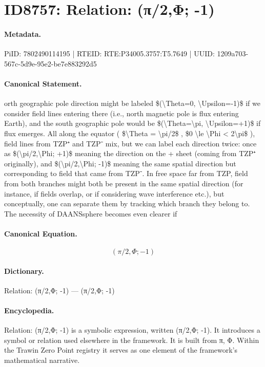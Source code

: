 \section*{ID8757: Relation: (π/2,Φ; -1)}
\paragraph{Metadata.}
PiID: 7802490114195 | RTEID: RTE:P34005.3757:T5.7649 | UUID: 1209a703-567c-5d9e-95e2-be7e883292d5

\paragraph{Canonical Statement.}
orth geographic pole direction might be labeled \$(\textbackslash{}Theta=0, \textbackslash{}Upsilon=-1)\$ if we consider field lines entering there (i.e., north magnetic pole is flux entering Earth), and the south geographic pole would be \$(\textbackslash{}Theta=\textbackslash{}pi, \textbackslash{}Upsilon=+1)\$ if flux emerges. All along the equator ( \$\textbackslash{}Theta = \textbackslash{}pi/2\$ , \$0 \textbackslash{}le \textbackslash{}Phi < 2\textbackslash{}pi\$ ), field lines from TZP⁺ and TZP⁻ mix, but we can label each direction twice: once as \$(\textbackslash{}pi/2,\textbackslash{}Phi; +1)\$ meaning the direction on the + sheet (coming from TZP⁺ originally), and \$(\textbackslash{}pi/2,\textbackslash{}Phi; -1)\$ meaning the same spatial direction but corresponding to field that came from TZP⁻. In free space far from TZP, field from both branches might both be present in the same spatial direction (for instance, if fields overlap, or if considering wave interference etc.), but conceptually, one can separate them by tracking which branch they belong to. The necessity of DAANSsphere becomes even clearer if

\paragraph{Canonical Equation.}
\[
(\pi/2,\Phi; -1)
\]

\paragraph{Dictionary.}
Relation: (π/2,Φ; -1) — (π/2,Φ; -1)

\paragraph{Encyclopedia.}
Relation: (π/2,Φ; -1) is a symbolic expression, written (π/2,Φ; -1). It introduces a symbol or relation used elsewhere in the framework. It is built from π, Φ. Within the Trawin Zero Point registry it serves as one element of the framework's mathematical narrative.
